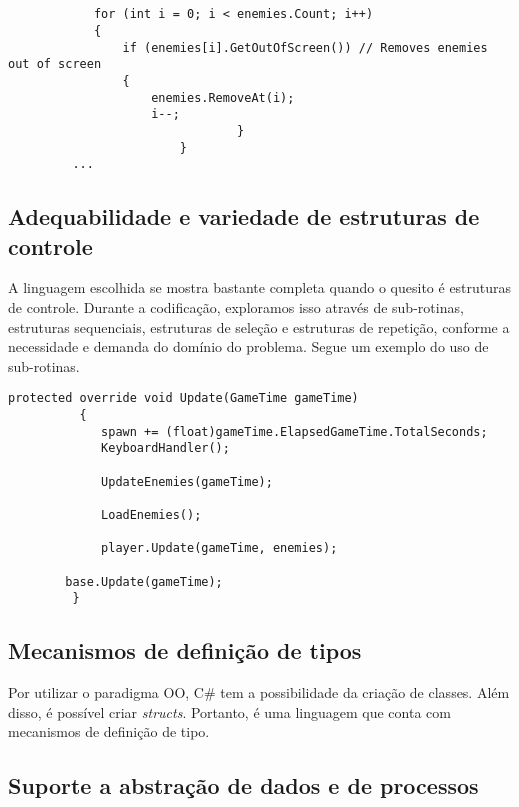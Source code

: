 \documentclass[rel_mlp]{iiufrgs}
\begin{document}
\begin{lstlisting}[caption=Trecho de código C\# retirado da implementação deste trabalho, label=lst:test]


			for (int i = 0; i < enemies.Count; i++)
            {
                if (enemies[i].GetOutOfScreen()) // Removes enemies out of screen
                {
                    enemies.RemoveAt(i);
                    i--;
								}
						}
	     ...

\end{lstlisting}

\subsection{Adequabilidade e variedade de estruturas de controle}

A linguagem escolhida se mostra bastante completa quando o quesito é estruturas de controle. Durante a codificação, exploramos isso através de sub-rotinas, estruturas sequenciais, estruturas de seleção e estruturas de repetição, conforme a necessidade e demanda do domínio do problema. Segue um exemplo do uso de sub-rotinas.

\begin{lstlisting}[caption=Trecho de código C\# retirado da implementação deste trabalho, label=lst:test]
protected override void Update(GameTime gameTime)
      	  {
           	 spawn += (float)gameTime.ElapsedGameTime.TotalSeconds;
           	 KeyboardHandler();

           	 UpdateEnemies(gameTime);

           	 LoadEnemies();

           	 player.Update(gameTime, enemies);

		base.Update(gameTime);
       	 }
\end{lstlisting}

\subsection{Mecanismos de definição de tipos}

Por utilizar o paradigma OO, C\# tem a possibilidade da criação de classes. Além disso, é possível criar \textit{structs}. Portanto, é uma linguagem que conta com mecanismos de definição de tipo.

\subsection{Suporte a abstração de dados e de processos}
\end{document}
